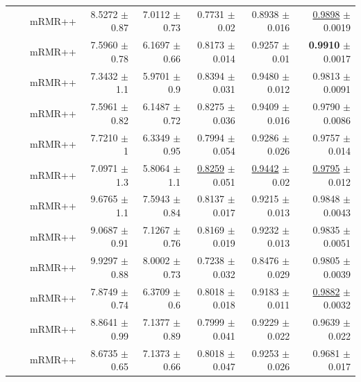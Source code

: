 \begin{longtable}{llp{}rrrrr}
 &  & mRMR++ & 8.5272 {\scriptsize $\pm$ 0.87} & 7.0112 {\scriptsize $\pm$ 0.73} & 0.7731 {\scriptsize $\pm$ 0.02} & 0.8938 {\scriptsize $\pm$ 0.016} & \underline{0.9898} {\scriptsize $\pm$ 0.0019} \\
 &  & mRMR++ & 7.5960 {\scriptsize $\pm$ 0.78} & 6.1697 {\scriptsize $\pm$ 0.66} & 0.8173 {\scriptsize $\pm$ 0.014} & 0.9257 {\scriptsize $\pm$ 0.01} & \textbf{0.9910} {\scriptsize $\pm$ 0.0017} \\
 &  & mRMR++ & 7.3432 {\scriptsize $\pm$ 1.1} & 5.9701 {\scriptsize $\pm$ 0.9} & 0.8394 {\scriptsize $\pm$ 0.031} & 0.9480 {\scriptsize $\pm$ 0.012} & 0.9813 {\scriptsize $\pm$ 0.0091} \\
 &  & mRMR++ & 7.5961 {\scriptsize $\pm$ 0.82} & 6.1487 {\scriptsize $\pm$ 0.72} & 0.8275 {\scriptsize $\pm$ 0.036} & 0.9409 {\scriptsize $\pm$ 0.016} & 0.9790 {\scriptsize $\pm$ 0.0086} \\
 &  & mRMR++ & 7.7210 {\scriptsize $\pm$ 1} & 6.3349 {\scriptsize $\pm$ 0.95} & 0.7994 {\scriptsize $\pm$ 0.054} & 0.9286 {\scriptsize $\pm$ 0.026} & 0.9757 {\scriptsize $\pm$ 0.014} \\
 &  & mRMR++ & 7.0971 {\scriptsize $\pm$ 1.3} & 5.8064 {\scriptsize $\pm$ 1.1} & \underline{0.8259} {\scriptsize $\pm$ 0.051} & \underline{0.9442} {\scriptsize $\pm$ 0.02} & \underline{0.9795} {\scriptsize $\pm$ 0.012} \\
 &  & mRMR++ & 9.6765 {\scriptsize $\pm$ 1.1} & 7.5943 {\scriptsize $\pm$ 0.84} & 0.8137 {\scriptsize $\pm$ 0.017} & 0.9215 {\scriptsize $\pm$ 0.013} & 0.9848 {\scriptsize $\pm$ 0.0043} \\
 &  & mRMR++ & 9.0687 {\scriptsize $\pm$ 0.91} & 7.1267 {\scriptsize $\pm$ 0.76} & 0.8169 {\scriptsize $\pm$ 0.019} & 0.9232 {\scriptsize $\pm$ 0.013} & 0.9835 {\scriptsize $\pm$ 0.0051} \\
 &  & mRMR++ & 9.9297 {\scriptsize $\pm$ 0.88} & 8.0002 {\scriptsize $\pm$ 0.73} & 0.7238 {\scriptsize $\pm$ 0.032} & 0.8476 {\scriptsize $\pm$ 0.029} & 0.9805 {\scriptsize $\pm$ 0.0039} \\
 &  & mRMR++ & 7.8749 {\scriptsize $\pm$ 0.74} & 6.3709 {\scriptsize $\pm$ 0.6} & 0.8018 {\scriptsize $\pm$ 0.018} & 0.9183 {\scriptsize $\pm$ 0.011} & \underline{0.9882} {\scriptsize $\pm$ 0.0032} \\
 &  & mRMR++ & 8.8641 {\scriptsize $\pm$ 0.99} & 7.1377 {\scriptsize $\pm$ 0.89} & 0.7999 {\scriptsize $\pm$ 0.041} & 0.9229 {\scriptsize $\pm$ 0.022} & 0.9639 {\scriptsize $\pm$ 0.022} \\
 &  & mRMR++ & 8.6735 {\scriptsize $\pm$ 0.65} & 7.1373 {\scriptsize $\pm$ 0.66} & 0.8018 {\scriptsize $\pm$ 0.047} & 0.9253 {\scriptsize $\pm$ 0.026} & 0.9681 {\scriptsize $\pm$ 0.017} \\

\end{longtable}
